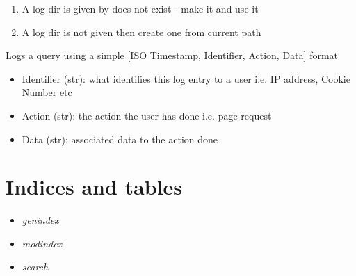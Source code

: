 \documentclass[letterpaper,10pt,english]{sphinxmanual}
\begin{document}
\begin{fulllineitems}
\begin{fulllineitems}
\begin{enumerate}
\item {} 
A log dir is given by does not exist - make it and use it

\item {} 
A log dir is not given then create one from current path

\end{enumerate}

\end{fulllineitems}


\begin{fulllineitems}
\label{api3.0:puppy.logging.EventLogger.log}
Logs a query using a simple {[}ISO Timestamp, Identifier, Action, Data{]} format
\begin{itemize}
\item {} 
Identifier (str): what identifies this log entry to a user i.e. IP address, Cookie Number etc

\item {} 
Action (str): the action the user has done i.e. page request

\item {} 
Data (str): associated data to the action done

\end{itemize}

\end{fulllineitems}


\end{fulllineitems}



\chapter{Indices and tables}
\label{index:indices-and-tables}\begin{itemize}
\item {} 
\emph{genindex}

\item {} 
\emph{modindex}

\item {} 
\emph{search}

\end{itemize}
\end{document}
